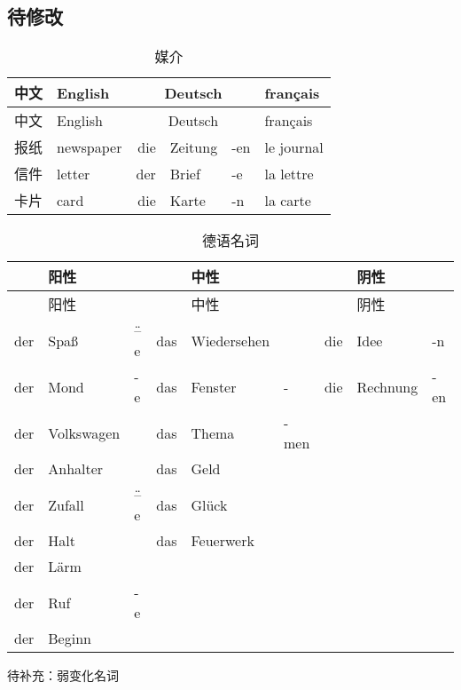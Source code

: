 \documentclass[12pt,A4paper,oneside,reqno]{amsart}
\numberwithin{equation}{section}
\theoremstyle{plain}
\theoremstyle{plain}
\theoremstyle{plain}
\numberwithin{equation}{section}
\theoremstyle{remark}
\begin{document}
\subsection{待修改}\hspace{1cm}
\begin{longtable}{c|l|rll|l}
	\hline
	中文	&	English	&\multicolumn{3}{c|}{Deutsch} &	français  	\\
	\hline
	\endhead
	\hline
	中文	&	English	&\multicolumn{3}{c|}{Deutsch} &	français  	\\
	\hline
	\endfirsthead	
	\hline
	\endfoot
	\hline	
	\caption{媒介}
	\endlastfoot				
报纸	&	newspaper	&	die	&	Zeitung	&	-en	&	le journal	\\
信件	&	letter	&	der	&	Brief	&	-e	&	la lettre	\\
卡片	&	card	&	die	&	Karte	&	-n	&	la carte	\\


	
\end{longtable}
\begin{longtable}{rll|rll|rll}
	\hline
	&阳性&	&	&中性&	& &阴性&		\\
	\hline
	\endhead
	\hline
	&阳性&	&	&中性&	& &阴性&		\\
	\hline
	\endfirsthead	
	\hline
	\endfoot
	\hline		
	\caption{德语名词}
	\endlastfoot				

der	&	Spa\ss	&	\"{--}e	&	das	&	Wiedersehen	&		&	die	&	Idee	&	-n	\\
der	&	Mond	&	-e	&	das	&	Fenster	&	-	&	die	&	Rechnung	&	-en	\\
der	&	Volkswagen	&		&	das	&	Thema	&	-men	&		&		&		\\
der	&	Anhalter	&		&	das	&	Geld	&		&		&		&		\\
der	&	Zufall	&	\"{--}e	&	das	&	Gl\"{u}ck	&		&		&		&		\\
der	&	Halt	&		&	das	&	Feuerwerk	&		&		&		&		\\
der	&	L\"{a}rm	&		&		&		&		&		&		&		\\
der	&	Ruf	&	-e	&		&		&		&		&		&		\\
der	&	Beginn	&		&		&		&		&		&		&		\\


\end{longtable}

待补充：弱变化名词
\end{document}
